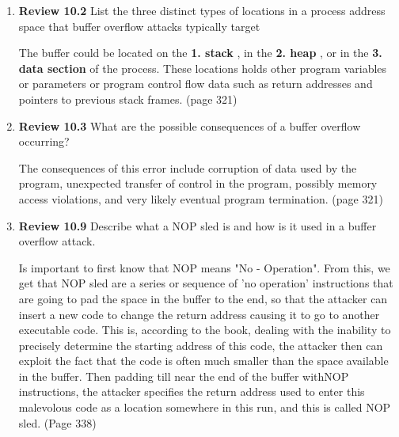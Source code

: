 \documentclass[12pt]{article}
\begin{document}
\renewcommand{\headrulewidth}{0.4pt}

\vspace{-3mm}

\begin{enumerate}

	
	\item {\textbf{Review 10.2} List the three distinct types of locations in a process address space that buffer overflow attacks typically target} 
	
	The buffer could be located on the \textbf{1. stack} , in the \textbf{2. heap} , or in the \textbf{3. data section} of the process. These locations holds other program variables or parameters or program control flow data such as return addresses and pointers to previous stack frames. (page 321)
		
	\vspace{10pt}
	
	\item {\textbf{Review 10.3}  What are the possible consequences of a buffer overflow occurring?}
	
		The consequences of this error include corruption of data used by the program, unexpected transfer of control in the program, possibly memory access violations, and very likely eventual program termination.  (page 321)
		
			\vspace{10pt}
	
	\item {\textbf{Review 10.9}  Describe what a NOP sled is and how is it used in a buffer overflow attack.}
	 
	Is important to first know that NOP means "No - Operation". From this, we get that NOP sled are a series or sequence of 'no operation' instructions that are going to pad the space in the buffer to the end, so that the attacker can insert a new code to change the return address causing it to go to another executable code. This is, according to the book, dealing with the inability to precisely determine the starting address of this code, the attacker then can exploit the fact that the code is often much smaller than the space available in the buffer. Then padding till near the end of the buffer withNOP instructions, the attacker specifies the return address used to enter this malevolous code as a location somewhere in this run, and this is called NOP sled.  (Page 338)
	 


\end{enumerate}
\end{document}
